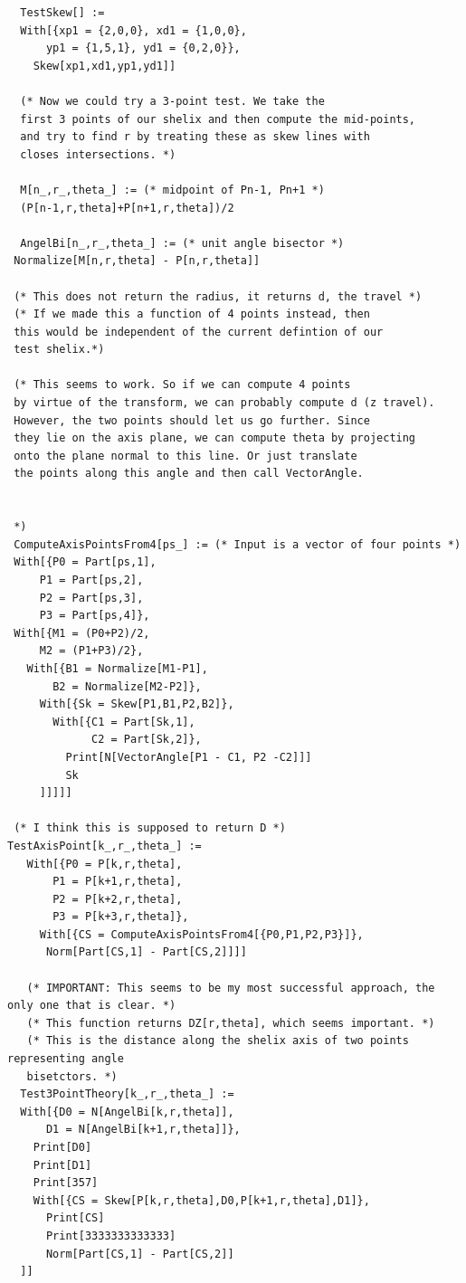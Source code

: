 \documentclass[11pt]{article}
\begin{document}
{\begin{verbatim}
  TestSkew[] :=
  With[{xp1 = {2,0,0}, xd1 = {1,0,0},
      yp1 = {1,5,1}, yd1 = {0,2,0}},
    Skew[xp1,xd1,yp1,yd1]]

  (* Now we could try a 3-point test. We take the
  first 3 points of our shelix and then compute the mid-points,
  and try to find r by treating these as skew lines with
  closes intersections. *)

  M[n_,r_,theta_] := (* midpoint of Pn-1, Pn+1 *)
  (P[n-1,r,theta]+P[n+1,r,theta])/2

  AngelBi[n_,r_,theta_] := (* unit angle bisector *)
 Normalize[M[n,r,theta] - P[n,r,theta]]

 (* This does not return the radius, it returns d, the travel *)
 (* If we made this a function of 4 points instead, then
 this would be independent of the current defintion of our
 test shelix.*)

 (* This seems to work. So if we can compute 4 points
 by virtue of the transform, we can probably compute d (z travel).
 However, the two points should let us go further. Since
 they lie on the axis plane, we can compute theta by projecting
 onto the plane normal to this line. Or just translate
 the points along this angle and then call VectorAngle.

 
 *)
 ComputeAxisPointsFrom4[ps_] := (* Input is a vector of four points *)
 With[{P0 = Part[ps,1],
     P1 = Part[ps,2],
     P2 = Part[ps,3],
     P3 = Part[ps,4]},
 With[{M1 = (P0+P2)/2,
     M2 = (P1+P3)/2},
   With[{B1 = Normalize[M1-P1],
       B2 = Normalize[M2-P2]},
     With[{Sk = Skew[P1,B1,P2,B2]},
       With[{C1 = Part[Sk,1],
             C2 = Part[Sk,2]},
         Print[N[VectorAngle[P1 - C1, P2 -C2]]]
         Sk
     ]]]]]

 (* I think this is supposed to return D *)
TestAxisPoint[k_,r_,theta_] :=
   With[{P0 = P[k,r,theta],
       P1 = P[k+1,r,theta],
       P2 = P[k+2,r,theta],
       P3 = P[k+3,r,theta]},
     With[{CS = ComputeAxisPointsFrom4[{P0,P1,P2,P3}]},
      Norm[Part[CS,1] - Part[CS,2]]]]       

   (* IMPORTANT: This seems to be my most successful approach, the only one that is clear. *)
   (* This function returns DZ[r,theta], which seems important. *)
   (* This is the distance along the shelix axis of two points representing angle
   bisetctors. *)
  Test3PointTheory[k_,r_,theta_] :=
  With[{D0 = N[AngelBi[k,r,theta]],
      D1 = N[AngelBi[k+1,r,theta]]},
    Print[D0]
    Print[D1]
    Print[357]
    With[{CS = Skew[P[k,r,theta],D0,P[k+1,r,theta],D1]},
      Print[CS]
      Print[3333333333333]
      Norm[Part[CS,1] - Part[CS,2]]
  ]]
  

\end{verbatim}}
\end{document}

